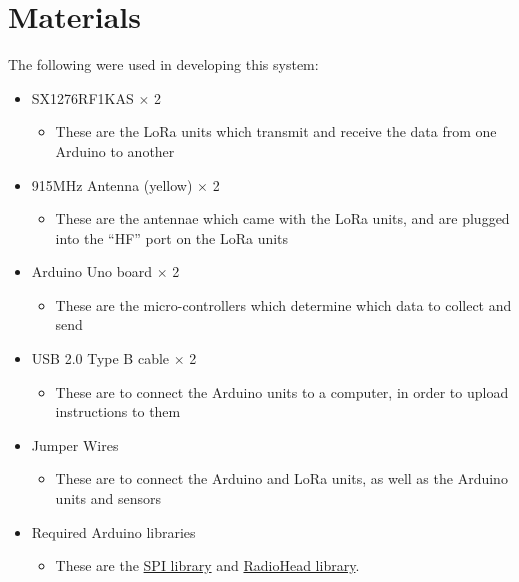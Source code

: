 \documentclass[11pt,onecolumn]{IEEEtran}
\begin{document}
\section{Materials}
\label{sec:materials}
The following were used in developing this system:
\begin{itemize}
\item SX1276RF1KAS $\times$ 2
  \begin{itemize}
  \item These are the LoRa units which transmit and receive the data from one Arduino to another
  \end{itemize}
\item 915MHz Antenna (yellow) $\times$ 2
  \begin{itemize}
  \item These are the antennae which came with the LoRa units, and are plugged into the ``HF'' port on the LoRa units
  \end{itemize}
\item Arduino Uno board $\times$ 2
  \begin{itemize}
  \item These are the micro-controllers which determine which data to collect and send
  \end{itemize}
\item USB 2.0 Type B cable $\times$ 2
  \begin{itemize}
  \item These are to connect the Arduino units to a computer, in order to upload instructions to them
  \end{itemize}
\item Jumper Wires
  \begin{itemize}
  \item These are to connect the Arduino and LoRa units, as well as the Arduino units and sensors
  \end{itemize}
  
\item Required Arduino libraries
  \begin{itemize}
  \item These are the \href{https://www.arduino.cc/en/Reference/SPI}{SPI library} and \href{https://github.com/PaulStoffregen/RadioHead}{RadioHead library}.
  \end{itemize}

\end{itemize}
\end{document}

